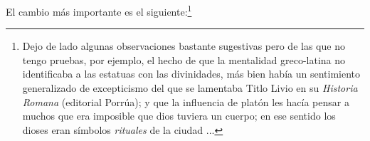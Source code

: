 \documentclass{article}
\begin{document}
El cambio m\'as importante es el siguiente:\footnote{Dejo de lado algunas observaciones bastante sugestivas pero de las que no tengo pruebas, por ejemplo, el hecho de que la mentalidad greco-latina no identificaba a las estatuas con las divinidades, m\'as bien hab\'{i}a un sentimiento generalizado de excepticismo del que se lamentaba Titlo Livio en su \emph{Historia Romana} (editorial Porr\'ua); y que la influencia de plat\'on les hac\'{i}a pensar a muchos que era imposible que dios tuviera un cuerpo; en ese sentido los dioses eran s\'{i}mbolos \emph{rituales} de la ciudad ...}











\end{document}
